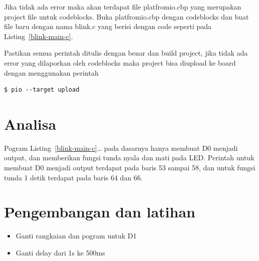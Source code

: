 Jika tidak ada error maka akan terdapat file platfromio.cbp yang merupakan project file untuk codeblocks. Buka platfromio.cbp dengan codeblocks dan buat file baru dengan nama blink.c yang berisi dengan code seperti pada Listing~\ref{blink-main-c}.



Pastikan semua perintah ditulis dengan benar dan build project, jika tidak ada error yang dilaporkan oleh codeblocks maka project bisa diupload ke board dengan menggunakan perintah

\begin{lstlisting}[label=blink-upload,caption=Upload Project ke board,style=bash]
$ pio --target upload
\end{lstlisting}

\section{Analisa}
Pogram Listing~\ref{blink-main-c}\ldots{} pada dasarnya hanya membuat D0 menjadi output, dan memberikan fungsi tunda nyala dan mati pada LED. Perintah untuk membuat D0 menjadi output terdapat pada baris 53 sampai 58, dan untuk fungsi tunda 1 detik terdapat pada baris 64 dan 66.

\section{Pengembangan dan latihan}
\begin{itemize}
\item Ganti rangkaian dan pogram untuk D1
\item Ganti delay dari 1s ke 500ms
\end{itemize}


